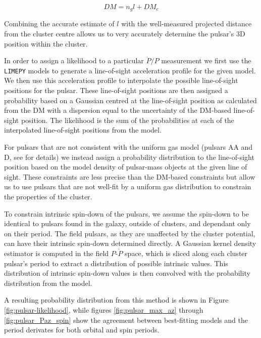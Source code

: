 \begin{equation}
    DM = n_g l + DM_c
    \label{eq:DM-los}
\end{equation}

Combining the accurate estimate of $l$ with the well-measured projected distance from the cluster
centre allows us to very accurately determine the pulsar's 3D position within the cluster.

In order to assign a likelihood to a particular $\dot{P}/P$ measurement we first use the
\texttt{LIMEPY} models to generate a line-of-sight acceleration profile for the given model. We then
use this acceleration profile to interpolate the possible line-of-sight positions for the pulsar.
These line-of-sight positions are then assigned a probability based on a Gaussian centred at the
line-of-sight position as calculated from the DM with a dispersion equal to the uncertainty of the
DM-based line-of-sight position. The likelihood is the sum of the probabilities at each of the
interpolated line-of-sight positions from the model.


For pulsars that are not consistent with the uniform gas model (pulsars AA and D, see
\citealt{Abbate2018} for details) we instead assign a probability distribution to the line-of-sight
position based on the model density of pulsar-mass objects at the given line of sight. These
constraints are less precise than the DM-based constraints but allow us to use pulsars that are not
well-fit by a uniform gas distribution to constrain the properties of the cluster.

To constrain intrinsic spin-down of the pulsars, we assume the spin-down to be identical to pulsars
found in the galaxy, outside of clusters, and dependant only on their period. The field pulsars, as
they are unaffected by the cluster potential, can have their intrinsic spin-down determined
directly. A Gaussian kernel density estimator is computed in the field $P$-$\dot{P}$ space, which is
sliced along each cluster pulsar's period to extract a distribution of possible intrinsic values.
This distribution of intrinsic spin-down values is then convolved with the probability distribution
from the model.

A resulting probability distribution from this method is shown in Figure
\ref{fig:pulsar-likelihood}, while figures \ref{fig:pulsar_max_az} through \ref{fig:pulsar_Paz_spin}
show the agreement between best-fitting models and the period derivates for both orbital and spin
periods.

